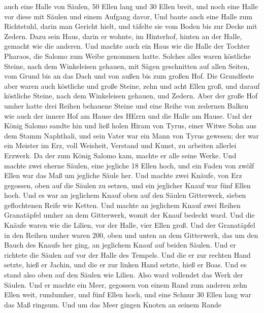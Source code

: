 auch eine Halle von Säulen, 50 Ellen lang und 30 Ellen breit, und noch
eine Halle vor diese mit Säulen und einem Aufgang davor, 
Und baute auch eine Halle zum Richtstuhl, darin man Gericht hielt, und
täfelte sie vom Boden bis zur Decke mit Zedern.  Dazu sein
Haus, darin er wohnte, im Hinterhof, hinten an der Halle, gemacht wie
die anderen. Und machte auch ein Haus wie die Halle der Tochter Pharaos,
die Salomo zum Weibe genommen hatte.  Solches alles waren
köstliche Steine, nach dem Winkeleisen gehauen, mit Sägen geschnitten
auf allen Seiten, vom Grund bis an das Dach und von außen bis zum großen
Hof.  Die Grundfeste aber waren auch köstliche und große
Steine, zehn und acht Ellen groß,  und darauf köstliche
Steine, nach dem Winkeleisen gehauen, und Zedern.  Aber der
große Hof umher hatte drei Reihen behauene Steine und eine Reihe von
zedernen Balken wie auch der innere Hof am Hause des HErrn und die Halle
am Hause.  Und der König Salomo sandte hin und ließ holen
Hiram von Tyrus,  einer Witwe Sohn aus dem Stamm Naphthali,
und sein Vater war ein Mann von Tyrus gewesen; der war ein Meister im
Erz, voll Weisheit, Verstand und Kunst, zu arbeiten allerlei Erzwerk. Da
der zum König Salomo kam, machte er alle seine Werke.  Und
machte zwei eherne Säulen, eine jegliche 18 Ellen hoch, und ein Faden
von zwölf Ellen war das Maß um jegliche Säule her.  Und
machte zwei Knäufe, von Erz gegossen, oben auf die Säulen zu setzen, und
ein jeglicher Knauf war fünf Ellen hoch.  Und es war an
jeglichem Knauf oben auf den Säulen Gitterwerk, sieben geflochtenen
Reife wie Ketten.  Und machte an jeglichem Knauf zwei
Reihen Granatäpfel umher an dem Gitterwerk, womit der Knauf bedeckt
ward.  Und die Knäufe waren wie die Lilien, vor der Halle,
vier Ellen groß.  Und der Granatäpfel in den Reihen umher
waren 200, oben und unten an dem Gitterwerk, das um den Bauch des Knaufs
her ging, an jeglichem Knauf auf beiden Säulen.  Und er
richtete die Säulen auf vor der Halle des Tempels. Und die er zur
rechten Hand setzte, hieß er Jachin, und die er zur linken Hand setzte,
hieß er Boas.  Und es stand also oben auf den Säulen wie
Lilien. Also ward vollendet das Werk der Säulen.  Und er
machte ein Meer, gegossen von einem Rand zum anderen zehn Ellen weit,
rundumher, und fünf Ellen hoch, und eine Schnur 30 Ellen lang war das
Maß ringsum.  Und um das Meer gingen Knoten an seinem Rande
